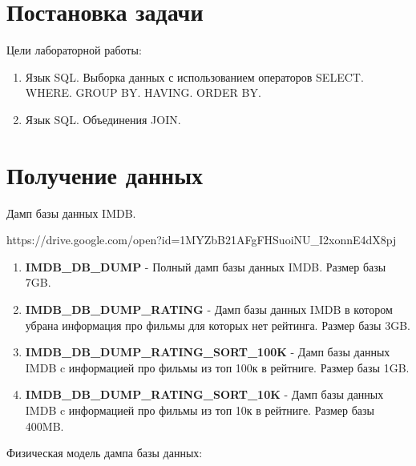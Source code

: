 \documentclass[12pt,a4paper]{article}
\begin{document}
\section{Постановка задачи}
Цели лабораторной работы:
\begin{enumerate}
    \item Язык SQL. Выборка данных с использованием операторов SELECT. WHERE. GROUP BY. HAVING. ORDER BY.
    \item Язык SQL. Объединения JOIN.
\end{enumerate}
\section{Получение данных}
Дамп базы данных IMDB. 

https://drive.google.com/open?id=1MYZbB21AFgFHSuoiNU\_I2xonnE4dX8pj
\begin{enumerate}
    \item \textbf{IMDB\_DB\_DUMP} - Полный дамп базы данных IMDB. Размер базы 7GB.
    \item \textbf{IMDB\_DB\_DUMP\_RATING} - Дамп базы данных IMDB в котором убрана информация про фильмы для которых нет рейтинга. Размер базы 3GB.
    \item \textbf{IMDB\_DB\_DUMP\_RATING\_SORT\_100K} - Дамп базы данных IMDB c информацией про фильмы из топ 100к в рейтниге. Размер базы 1GB.
    \item \textbf{IMDB\_DB\_DUMP\_RATING\_SORT\_10K} - Дамп базы данных IMDB c информацией про фильмы из топ 10к в рейтниге. Размер базы 400MB.
\end{enumerate} \par
Физическая модель дампа базы данных:
\end{document}
